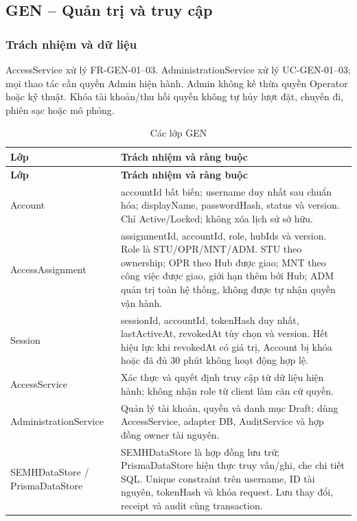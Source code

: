 \clearpage
\subsection{GEN -- Quản trị và truy cập}

\subsubsection{Trách nhiệm và dữ liệu}
AccessService xử lý FR-GEN-01--03. AdministrationService xử lý UC-GEN-01--03; mọi thao tác cần quyền Admin hiện hành. Admin không kế thừa quyền Operator hoặc kỹ thuật. Khóa tài khoản/thu hồi quyền không tự hủy lượt đặt, chuyến đi, phiên sạc hoặc mô phỏng.

\begin{longtable}{|L{34mm}|L{105mm}|}
\caption{Các lớp GEN}\\\hline
\textbf{Lớp} & \textbf{Trách nhiệm và ràng buộc}\\\hline
\endfirsthead
\hline\textbf{Lớp} & \textbf{Trách nhiệm và ràng buộc}\\\hline\endhead
Account & accountId bất biến; username duy nhất sau chuẩn hóa; displayName, passwordHash, status và version. Chỉ Active/Locked; không xóa lịch sử sở hữu.\\\hline
AccessAssignment & assignmentId, accountId, role, hubIds và version. Role là STU/OPR/MNT/ADM. STU theo ownership; OPR theo Hub được giao; MNT theo công việc được giao, giới hạn thêm bởi Hub; ADM quản trị toàn hệ thống, không được tự nhận quyền vận hành.\\\hline
Session & sessionId, accountId, tokenHash duy nhất, lastActiveAt, revokedAt tùy chọn và version. Hết hiệu lực khi revokedAt có giá trị, Account bị khóa hoặc đã đủ 30 phút không hoạt động hợp lệ.\\\hline
AccessService & Xác thực và quyết định truy cập từ dữ liệu hiện hành; không nhận role từ client làm căn cứ quyền.\\\hline
Administration\allowbreak Service & Quản lý tài khoản, quyền và danh mục Draft; dùng AccessService, adapter DB, AuditService và hợp đồng owner tài nguyên.\\\hline
SEMHDataStore / PrismaDataStore & SEMHDataStore là hợp đồng lưu trữ; PrismaDataStore hiện thực truy vấn/ghi, che chi tiết SQL. Unique constraint trên username, ID tài nguyên, tokenHash và khóa request. Lưu thay đổi, receipt và audit cùng transaction.\\\hline
\end{longtable}

